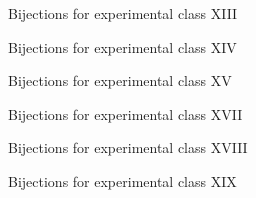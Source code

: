 \begin{comment}
\begin{figure}[ht!]
    \centering
    
    \caption{Bijections for experimental class XII}
    \label{fig:expgrp_XII}
\end{figure}
\end{comment}


\begin{figure}[ht!]
    \centering
    
    \caption{Bijections for experimental class XIII}
    \label{fig:expgrp_XIII}
\end{figure}


\begin{figure}[ht!]
    \centering
    
    \caption{Bijections for experimental class XIV}
    \label{fig:expgrp_XIV}
\end{figure}


\begin{figure}[ht!]
    \centering
    
    \caption{Bijections for experimental class XV}
    \label{fig:expgrp_XV}
\end{figure}


\begin{comment}
\begin{figure}[ht!]
    \centering
    
    \caption{Bijections for experimental class XVI}
    \label{fig:expgrp_XVI}
\end{figure}
\end{comment}


\begin{figure}[ht!]
    \centering
    
    \caption{Bijections for experimental class XVII}
    \label{fig:expgrp_XVII}
\end{figure}


\begin{figure}[ht!]
    \centering
    
    \caption{Bijections for experimental class XVIII}
    \label{fig:expgrp_XVIII}
\end{figure}


\begin{figure}[ht!]
    \centering
    
    \caption{Bijections for experimental class XIX}
    \label{fig:expgrp_XIX}
\end{figure}


